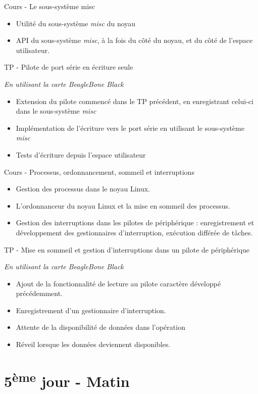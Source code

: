 \documentclass[a4paper,12pt,obeyspaces,spaces,hyphens]{article}
\begin{document}
\feagendatwocolumn
{Cours - Le sous-système misc}
{
  \begin{itemize}
  \item Utilité du sous-système {\em misc} du noyau
  \item API du sous-système {\em misc}, à la fois du côté du noyau, et
    du côté de l'espace utilisateur.
  \end{itemize}
}
{TP - Pilote de port série en écriture seule}
{
  {\em En utilisant la carte BeagleBone Black}
  \begin{itemize}
  \item Extension du pilote commencé dans le TP précédent, en
    enregistrant celui-ci dans le sous-système {\em misc}
  \item Implémentation de l'écriture vers le port série en
    utilisant le sous-système {\em misc}
  \item Tests d'écriture depuis l'espace utilisateur
  \end{itemize}
}

\feagendatwocolumn
{Cours - Processus, ordonnancement, sommeil et interruptions}
{
  \begin{itemize}
  \item Gestion des processus dans le noyau Linux.
  \item L'ordonnanceur du noyau Linux et la mise en sommeil des processus.
  \item Gestion des interruptions dans les pilotes de périphérique :
    enregistrement et développement des gestionnaires d'interruption,
    exécution différée de tâches.
  \end{itemize}
}
{TP - Mise en sommeil et gestion d'interruptions dans un pilote de périphérique}
{
  {\em En utilisant la carte BeagleBone Black}
  \begin{itemize}
  \item Ajout de la fonctionnalité de lecture au pilote caractère développé
    précédemment.
  \item Enregistrement d'un gestionnaire d'interruption.
  \item Attente de la disponibilité de données dans l'opération 
  \item Réveil lorsque les données deviennent disponibles.
  \end{itemize}
}

\section{5\textsuperscript{ème} jour - Matin}
\end{document}
